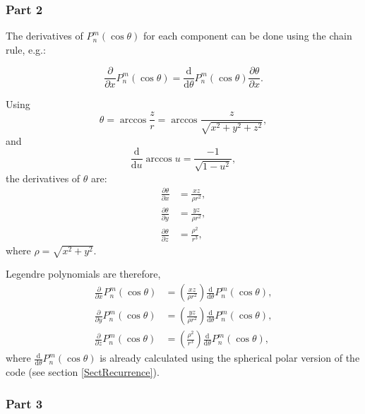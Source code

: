 \documentclass[]{article}
\begin{document}
		\subsubsection{Part 2}
			
			The derivatives of $P_n^m(\cos\theta)$ for each component can be done using the chain rule, e.g.:
			
			\begin{equation}
				\frac{\partial}{\partial x} P_n^m(\cos\theta) = \frac{\text{d}}{\text{d} \theta} P_n^m(\cos\theta) \frac{\partial \theta}{\partial x}.
			\end{equation}
			
			Using
			\begin{equation}
			\theta = \arccos\frac{z}{r} = \arccos{\frac{z}{\sqrt{x^2 + y^2 + z^2}}},
			\end{equation}
			and 
			\begin{equation}
				\frac{\text{d}}{\text{d} u} \arccos{u} = \frac{-1}{\sqrt{1 - u^2}}, 
			\end{equation}
			the derivatives of $\theta$ are:
			\begin{align}
				\frac{\partial \theta}{\partial x} &= \frac{xz}{\rho r^2}, \\
				\frac{\partial \theta}{\partial y} &= \frac{yz}{\rho r^2}, \\
				\frac{\partial \theta}{\partial z} &= \frac{\rho^2}{r^3}, 
			\end{align}
			where $\rho = \sqrt{x^2 + y^2}$.
			
			Legendre polynomials are therefore,
			\begin{align}
				\frac{\partial}{\partial x} P_n^m(\cos\theta) &= \left(\frac{xz}{\rho r^2}\right)\frac{\text{d}}{\text{d} \theta} P_n^m(\cos\theta), \\
				\frac{\partial}{\partial y} P_n^m(\cos\theta) &= \left(\frac{yz}{\rho r^2}\right)\frac{\text{d}}{\text{d} \theta} P_n^m(\cos\theta), \\
				\frac{\partial}{\partial z} P_n^m(\cos\theta) &= \left(\frac{\rho^2}{r^3}\right)\frac{\text{d}}{\text{d} \theta} P_n^m(\cos\theta), 
			\end{align}	
			where $\frac{\text{d}}{\text{d} \theta} P_n^m(\cos\theta)$ is already calculated using the spherical polar version of the code (see section \ref{SectRecurrence}).
		
		\subsubsection{Part 3}		
		
\end{document}
